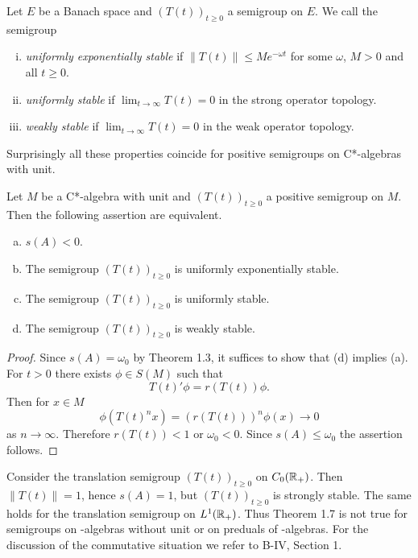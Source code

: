\begin{definition}\label{def:d4-1.6}
Let $E$ be a Banach space and $(T(t))_{t \geq 0}$ a semigroup on $E$.
We call the semigroup
\begin{enumerate}[(i)]
\item 
\emph{uniformly exponentially stable} if $\|T(t)\| \leq Me^{-\omega t}$ for some $\omega$, $M > 0$ and all $t \geq 0$.

\item 
\emph{uniformly stable} if $\lim_{t \to \infty} T(t) = 0$ in the strong operator topology.

\item 
\emph{weakly stable} if $\lim_{t \to \infty} T(t) = 0$ in the weak operator topology.
\end{enumerate}
\end{definition}
Surprisingly all these properties coincide for positive semigroups on C*-algebras with unit.
\begin{theorem}\label{thm:d4-1.7}
Let $M$ be a C*-algebra with unit and $(T(t))_{t \geq 0}$ a positive semigroup on $M$.
Then the following assertion are equivalent.

\begin{enumerate}[(a)]
\item 
$s(A) < 0$.

\item 
The semigroup $(T(t))_{t \geq 0}$ is uniformly exponentially stable.

\item 
The semigroup $(T(t))_{t \geq 0}$ is uniformly stable.

\item 
The semigroup $(T(t))_{t \geq 0}$ is weakly stable.

\end{enumerate}
\end{theorem}
\begin{proof}
Since $s(A) = \omega_{0}$ by Theorem 1.3, it suffices to show that (d) implies (a).
For $t > 0$ there exists $\phi \in S(M)$ such that
\[
    T(t)'\phi = r(T(t))\phi .
\]
Then for $x \in M$
\[
    \phi(T(t)^{n}x) = (r(T(t)))^{n} \phi(x) \to 0
\]
as $n \to \infty$.
Therefore $r(T(t)) < 1$ or $\omega_{0} < 0$.
Since $s(A) \leq \omega_{0}$ the assertion follows.
\end{proof}
\begin{remark}\label{rem:d4-1.8}
Consider the translation semigroup $(T(t))_{t \geq 0}$ on $C_{0}(\mathbb{R}_{+})$. 
Then $\|T(t)\| = 1$, hence $s(A) = 1$, but $(T(t))_{t \geq 0}$ is strongly stable.
The same holds for the translation semigroup on $L^1(\mathbb{R}_{+})$.
Thus Theorem 1.7 is not true for semigroups on \CA-algebras without unit or on preduals of \WA-algebras.
For the discussion of the commutative situation we refer to B-IV, Section 1.
\end{remark}
